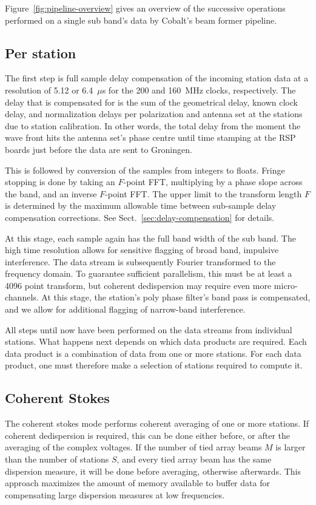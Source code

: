 \documentclass[a4paper,twoside]{article}
\newcommand{\cobalt}{Cobalt\xspace}
\begin{document}
Figure~\ref{fig:pipeline-overview} gives an overview of the successive
operations performed on a single sub band's data by \cobalt's beam
former pipeline. 

\subsection{Per station}

The first step is full sample delay compensation of the incoming
station data at a resolution of 5.12 or 6.4~$\mu$s for the 200 and
160~MHz clocks, respectively. The delay that is compensated for is the
sum of the geometrical delay, known clock delay, and normalization
delays per polarization and antenna set at the stations due to station
calibration. In other words, the total delay from the moment the wave
front hits the antenna set's phase centre until time stamping at the
RSP boards just before the data are sent to Groningen.

This is followed by conversion of the samples from integers to
floats. Fringe stopping is done by taking an $F$-point FFT,
multiplying by a phase slope across the band, and an inverse $F$-point
FFT. The upper limit to the transform length $F$ is determined by the
maximum allowable time between sub-sample delay compensation
corrections. See Sect.~\ref{sec:delay-compensation} for details.

At this stage, each sample again has the full band width of the sub
band. The high time resolution allows for sensitive flagging of broad
band, impulsive interference. The data stream is subsequently Fourier
transformed to the frequency domain. To guarantee sufficient
parallelism, this must be at least a 4096 point transform, but
coherent dedispersion may require even more micro-channels. At this
stage, the station's poly phase filter's band pass is compensated, and
we allow for additional flagging of narrow-band interference.

All steps until now have been performed on the data streams from
individual stations. What happens next depends on which data products
are required. Each data product is a combination of data from one or
more stations. For each data product, one must therefore make a
selection of stations required to compute it.


\subsection{Coherent Stokes}

The coherent stokes mode performs coherent averaging of one or more
stations. If coherent dedispersion is required, this can be done
either before, or after the averaging of the complex voltages. If the
number of tied array beams $M$ is larger than the number of stations
$S$, and every tied array beam has the same dispersion measure, it
will be done before averaging, otherwise afterwards. This
approach maximizes the amount of memory available to buffer data for
compensating large dispersion measures at low frequencies.
\end{document}
